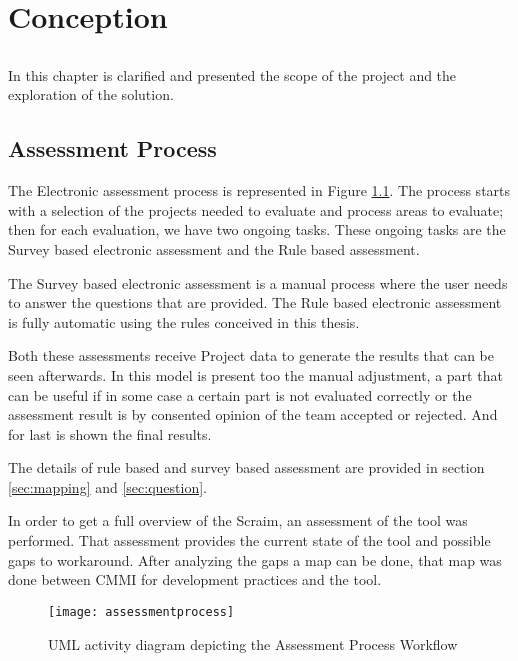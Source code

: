 \chapter{Conception} \label{chap:conception}

\section*{}

In this chapter is clarified and presented the scope of the project and the exploration of the solution.

\section{Assessment Process} \label{sec:Approach}

The Electronic assessment process is represented in Figure \ref{fig:assessmentprocess}.
The process starts with a selection of the projects needed to evaluate and process areas to evaluate; then for each evaluation, we have two ongoing tasks. These ongoing tasks are the Survey based electronic assessment and the Rule based assessment.

The Survey based electronic assessment is a manual process where the user needs to answer the questions that are provided. The Rule based electronic assessment is fully automatic using the rules conceived in this thesis.

Both these assessments receive Project data to generate the results that can be seen afterwards. In this model is present too the manual adjustment, a part that can be useful if in some case a certain part is not evaluated correctly or the assessment result is by consented opinion of the team accepted or rejected. And for last is shown the final results. 

The details of rule based and survey based assessment are provided in section \ref{sec:mapping} and \ref{sec:question}.

In order to get a full overview of the Scraim, an assessment of the tool was performed. That assessment provides the current state of the tool and possible gaps to workaround.
After analyzing the gaps a map can be done, that map was done between CMMI for development practices and the tool.

\newpage
	\begin{figure}[!htb]
		\begin{center}
			\leavevmode
			\texttt{[image: assessmentprocess]}
			\caption{UML activity diagram depicting the Assessment Process Workflow}
			\label{fig:assessmentprocess}
		\end{center}
	\end{figure}


